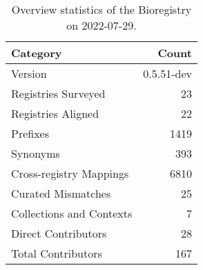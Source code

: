 \begin{table}
\centering
\caption{Overview statistics of the Bioregistry on 2022-07-29.}
\label{tab:bioregistry-summary}
\begin{tabular}{lr}
\toprule
                Category &      Count \\
\midrule
                 Version & 0.5.51-dev \\
     Registries Surveyed &         23 \\
      Registries Aligned &         22 \\
                Prefixes &       1419 \\
                Synonyms &        393 \\
 Cross-registry Mappings &       6810 \\
      Curated Mismatches &         25 \\
Collections and Contexts &          7 \\
     Direct Contributors &         28 \\
      Total Contributors &        167 \\
\bottomrule
\end{tabular}
\end{table}
